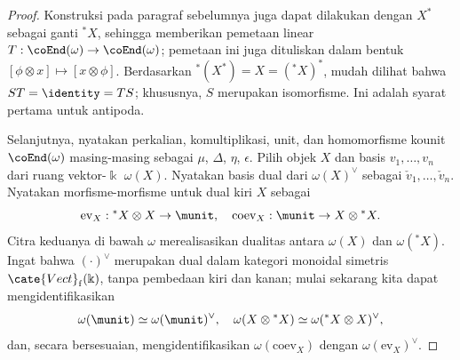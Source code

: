 \begin{proof}
	Konstruksi pada paragraf sebelumnya juga dapat dilakukan dengan $X^*$
	sebagai ganti ${}^* X$, sehingga memberikan pemetaan linear
	$T: \coEnd(\omega) \to \coEnd(\omega)$; pemetaan ini juga dituliskan
	dalam bentuk $[\phi \otimes x] \mapsto [x \otimes \phi]$. Berdasarkan
	${}^* (X^*) = X = ({}^* X)^*$, mudah dilihat bahwa
	$ST = \identity = TS$; khususnya, $S$ merupakan isomorfisme. Ini adalah
	syarat pertama untuk antipoda.
	
	Selanjutnya, nyatakan perkalian, komultiplikasi, unit, dan homomorfisme
	kounit $\coEnd(\omega)$ masing-masing sebagai $\mu$, $\Delta$, $\eta$,
	$\epsilon$. Pilih objek $X$ dan basis $v_1, \ldots, v_n$ dari ruang
	vektor-$\Bbbk$ $\omega(X)$. Nyatakan basis dual dari $\omega(X)^\vee$
	sebagai $\check{v}_1, \ldots, \check{v}_n$. Nyatakan morfisme-morfisme
	untuk dual kiri $X$ sebagai
	\[ \mathrm{ev}_X: {}^* X \otimes X \to \munit, \quad \mathrm{coev}_X: \munit \to X \otimes {}^* X. \]
	Citra keduanya di bawah $\omega$ merealisasikan dualitas antara
	$\omega(X)$ dan $\omega({}^* X)$. Ingat bahwa $(\cdot)^\vee$ merupakan
	dual dalam kategori monoidal simetris $\cate{Vect}_{\mathrm{f}}(\Bbbk)$,
	tanpa pembedaan kiri dan kanan; mulai sekarang kita dapat
	mengidentifikasikan
	\begin{equation*}
		\omega(\munit) \simeq \omega(\munit)^\vee, \quad \omega(X \otimes {}^* X) \simeq \omega({}^* X \otimes X)^\vee,
	\end{equation*}
	dan, secara bersesuaian, mengidentifikasikan $\omega(\mathrm{coev}_X)$
	dengan $\omega(\mathrm{ev}_X)^\vee$.
	

\end{proof}
